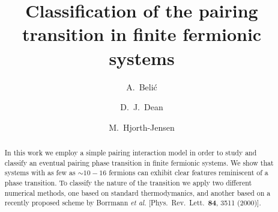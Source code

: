 


\draft

\title{Classification of the pairing transition in finite fermionic systems}
\author{A.~Beli\'c}
\address{Institute of Physics, P.O.B. 57,Belgrade 11001, Yugoslavia}  
\author{ D.~J.~Dean}
\address{Physics Division, Oak Ridge National Laboratory, P.~O.~Box 2008, Oak Ridge, Tennessee 37831}
\author{M.~Hjorth-Jensen} 
\address{Department of Physics, University of Oslo, N-0316 Oslo, Norway}

\maketitle

\begin{abstract}
In this work we employ a simple pairing interaction
model in order to study and classify an 
eventual pairing phase transition in finite
fermionic systems. 
We show that systems with as few as $\sim 10-16$ fermions 
can exhibit clear features reminiscent of a phase transition. 
To classify the nature of the transition we apply two different
numerical methods, one based on standard thermodymanics, and another based on 
a recently  proposed scheme by Borrmann {\em et al.}
[Phys.~Rev.~Lett.~{\bf 84}, 3511 (2000)].

\end{abstract}

